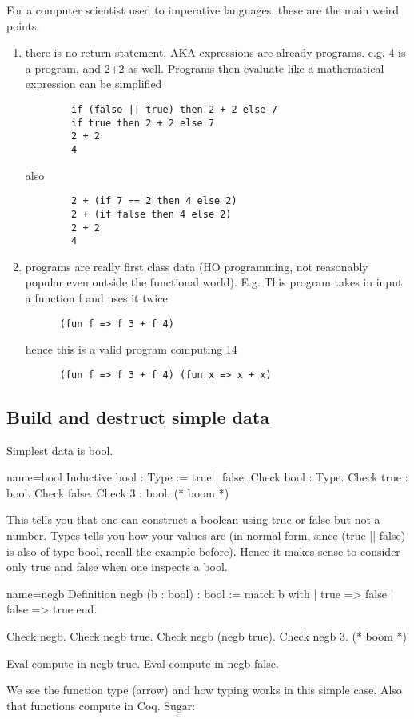 For a computer scientist used to imperative languages, these are the main weird points:
\begin{enumerate}
\item there is no return statement, AKA expressions are already programs.  e.g.
	4 is a program, and 2+2 as well.  Programs then evaluate like a mathematical expression
	can be simplified
\begin{verbatim}
        if (false || true) then 2 + 2 else 7
        if true then 2 + 2 else 7
        2 + 2
        4
\end{verbatim}
also
\begin{verbatim}
        2 + (if 7 == 2 then 4 else 2)
        2 + (if false then 4 else 2)
        2 + 2
        4
\end{verbatim}
\item programs are really first class data (HO programming, not reasonably popular even outside
	the functional world). E.g.
    This program takes in input a function f and uses it twice
\begin{verbatim}
      (fun f => f 3 + f 4)
\end{verbatim}
hence this is a valid program computing 14
\begin{verbatim}
      (fun f => f 3 + f 4) (fun x => x + x)
\end{verbatim}
\end{enumerate}


\subsection{Build and destruct simple data}
Simplest data is bool.

\begin{coq}{name=bool}{}
Inductive bool : Type := true | false.
Check bool : Type.
Check true : bool.
Check false.
Check 3 : bool. (* boom *)
\end{coq}

This tells you that one can construct a boolean using true or false but not a number.
Types tells you how your values are (in normal form, since (true || false) is also of type bool, recall the example before).
Hence it makes sense to consider only true and false when one inspects a bool.

\begin{coq}{name=negb}{}
Definition negb (b : bool) : bool :=
  match b with
  | true => false
  | false => true
  end.

Check negb.
Check negb true.
Check negb (negb true).
Check negb 3. (* boom *)

Eval compute in negb true.
Eval compute in negb false.
\end{coq}
We see the function type (arrow) and how typing works in this simple case.
Also that functions compute in Coq.
Sugar:

